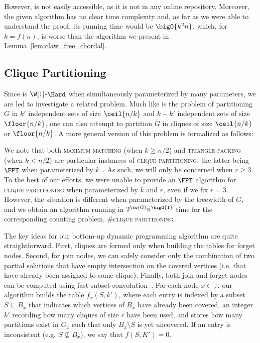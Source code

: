 However, \citep{claw_free_de_werra} is not easily accessible, as it is not in any online repository.
Moreover, the given algorithm has no clear time complexity and, as far as we were able to understand the proof, its running time would be $\bigO{k^2n}$, which, for $k = f(n)$, is worse than the algorithm we present in Lemma~\ref{lem:claw_free_chordal}.

\subsection{Clique Partitioning}

Since  is $\W[1]$-$\Hard$ when simultaneously parameterized by many parameters, we are led to investigate a related problem.
Much like  is the problem of partitioning $G$ in $k'$ independent sets of size $\ceil{n/k}$ and $k - k'$ independent sets of size $\floor{n/k}$, one can also attempt to partition $\overline{G}$ in cliques of size $\ceil{n/k}$ or $\floor{n/k}$.
A more general version of this problem is formalized as follows:


We note that both \textsc{maximum matching} (when $k \geq n/2$) and \textsc{triangle packing} (when $k < n/2$) are particular instances of \textsc{clique partitioning}, the latter being $\FPT$ when parameterized by $k$~\citep{triangle_packing}.
As such, we will only be concerned when $r \geq 3$.
To the best of our efforts, we were unable to provide an $\FPT$ algorithm for \textsc{clique partitioning} when parameterized by $k$ and $r$, even if we fix $r = 3$.
However, the situation is different when parameterized by the treewidth of $G$, and we obtain an algorithm running in $2^{\tw(G)}n^{\bigO{1}}$ time for the corresponding counting problem, \textsc{\#clique partitioning}.

The key ideas for our bottom-up dynamic programming algorithm are quite straightforward. First, cliques are formed only when building the tables for forget nodes. Second, for join nodes, we can safely consider only the combination of two partial solutions that have empty intersection on the covered vertices (i.e. that have already been assigned to some clique). Finally, both join and forget nodes can be computed using fast subset convolution~\citep{fourier_mobius}.
For each node $x \in \mathbb{T}$, our algorithm builds the table $f_x(S, k')$, where each entry is indexed by a subset $S \subseteq B_x$ that indicates which vertices of $B_x$ have already been covered, an integer $k'$ recording how many cliques of size $r$ have been used, and stores how many partitions exist in $G_x$ such that only $B_x \setminus S$ is yet uncovered.
If an entry is inconsistent (e.g. $S \nsubseteq B_x$), we say that $f(S, K') = 0$.

